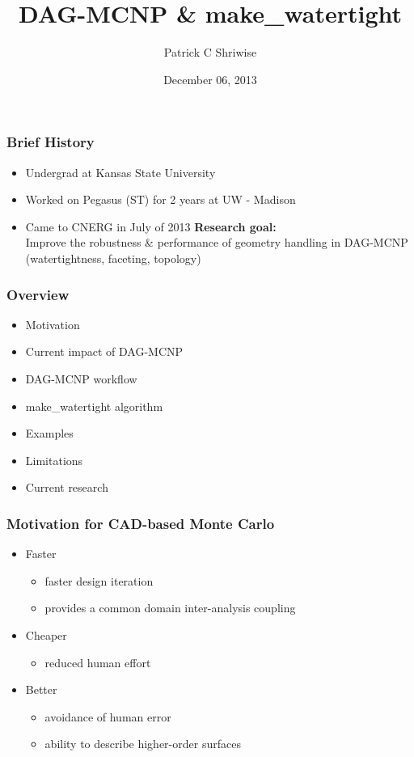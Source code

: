 \documentclass[14pt]{beamer}
\begin{document}
\title{DAG-MCNP \& make\_watertight}
\author{Patrick C Shriwise}
\date{December 06, 2013}

\maketitle


\begin{frame}
\frametitle{Brief History}
\begin{itemize}
\item Undergrad at Kansas State University
\item Worked on Pegasus (ST) for 2 years at UW - Madison
\item Came to CNERG in July of 2013
\vfill
\textbf{Research goal:} \\
Improve the robustness \& performance of geometry handling in DAG-MCNP\\
(watertightness, faceting, topology)
\end{itemize}
\end{frame}

\begin{frame}
\frametitle{Overview}

\begin{itemize}

\item Motivation
\item Current impact of DAG-MCNP
\item DAG-MCNP workflow
\item make\_watertight algorithm
\item Examples
\item Limitations
\item Current research

\end{itemize}
\end{frame}

\begin{frame}
\frametitle{Motivation for CAD-based Monte Carlo}
\begin{itemize}
\vfill
\item Faster
	\begin{itemize}
	\item faster design iteration
	\item provides a common domain inter-analysis coupling
	\end{itemize}
\vfill
\item Cheaper
	\begin{itemize}
	\item reduced human effort
	\end{itemize}
\vfill
\item Better
	\begin{itemize}
	\item avoidance of human error
	\item ability to describe higher-order surfaces
	\end{itemize}
\end{itemize}

\end{frame}
\end{document}
